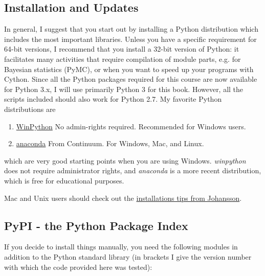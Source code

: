\subsection{Installation and Updates}

In general, I suggest that you start out by installing a Python distribution which includes the most important libraries. Unless you have a specific requirement for 64-bit versions, I recommend that you install a 32-bit version of Python: it facilitates many activities that require compilation of module parts, e.g. for Bayesian statistics (PyMC), or when you want to speed up your programs with Cython. Since all the Python packages required for this course are now available for Python 3.x, I will use primarily Python 3 for this book. However, all the scripts included should also work for Python 2.7. My favorite Python distributions  are

\begin{enumerate}
    \item \href{https://winpython.github.io/}{WinPython} No admin-rights required. Recommended for Windows users.
    \item \href{https://store.continuum.io/cshop/anaconda/}{anaconda} From Continuum. For Windows, Mac, and Linux.
\end{enumerate}

which are very good starting points when you are using Windows. \emph{winpython} does not require administrator rights, and \emph{anaconda} is a more recent distribution, which is free for educational purposes.

Mac and Unix users should check out the \href{https://github.com/jrjohansson/scientific-python-lectures}{installations tips from Johansson}.

\subsection{PyPI - the Python Package Index}

If you decide to install things manually, you need the following modules in addition to the Python standard library (in brackets I give the version number with which the code provided here was tested):

